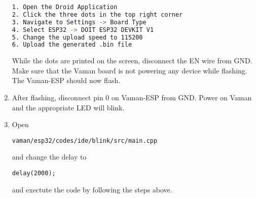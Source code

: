\documentclass[12pt]{article}
\begin{document}
\begin{enumerate}[label=\thesection.\arabic*.,ref=\thesection.\theenumi]
\begin{lstlisting}[language=bash]
1. Open the Droid Application
2. Click the three dots in the top right corner
3. Navigate to Settings -> Board Type
4. Select ESP32 -> DOIT ESP32 DEVKIT V1
5. Change the upload speed to 115200
6. Upload the generated .bin file
\end{lstlisting}
While the dots are printed on the screen, disconnect the EN wire from GND.   Make sure that the Vaman board is not powering any device while flashing.  The Vaman-ESP should now flash.
\iffalse
\item Execute the following
\begin{lstlisting}
cd vaman/esp32/codes/ide/blink
pio run 
pio run -t nobuild -t upload
\end{lstlisting}
While the dots and dashes are printed on the screen, disconnect the EN wire from GND.   Make sure that the Vaman board is not powering any device while flashing.  The Vaman-ESP should now flash.
\fi
\item After flashing, disconnect pin 0 on Vaman-ESP from GND. Power on Vaman and the appropriate LED will blink.
\item Open
\begin{lstlisting}
vaman/esp32/codes/ide/blink/src/main.cpp 
\end{lstlisting}
and change the delay to 
\begin{lstlisting}
delay(2000);
\end{lstlisting}
and exectute the code by following the steps above.
\end{enumerate}
\end{document}
